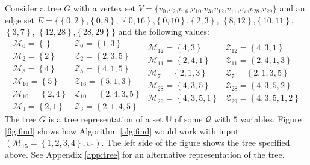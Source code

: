 Consider a tree $G$ with a vertex set
$
V =
\{
v_0$,$v_2$,$v_{16}$,$v_{10}$,$v_3$,$v_{12}$,$v_{11}$,$v_7$,$v_{28}$,$v_{29}
\}
$
and an edge set
$
E = \{
\left\{{0,2}\right\}$,$\left\{{0,8}\right\}$,
$\left\{{0,16}\right\}$,$\left\{{0,10}\right\}$,$\left\{{2,3}\right\}$,
$\left\{{8,12}\right\}$,$\left\{{10,11}\right\}$,
$\left\{{3,7}\right\}$,
$\left\{{12,28}\right\}$,$\left\{{28,29}\right\} \}
$
and the following values:
\[
    \begin{array}{ll}
        \mathcal{M}_0    = \left\{{}\right\}           & \mathcal{Z}_0    = \left\{{1,3}\right\} \\
        \mathcal{M}_2    = \left\{{2}\right\}          & \mathcal{Z}_2    = \left\{{2,3,5}\right\} \\
        \mathcal{M}_8    = \left\{{4}\right\}          & \mathcal{Z}_8    = \left\{{4,1,5}\right\} \\
        \mathcal{M}_{16} = \left\{{5}\right\}          & \mathcal{Z}_{16} = \left\{{5,1,3}\right\} \\
        \mathcal{M}_{10} = \left\{{2,4}\right\}        & \mathcal{Z}_{10} = \left\{{2,4,3,5}\right\} \\
        \mathcal{M}_3    = \left\{{2,1}\right\}        & \mathcal{Z}_3    = \left\{{2,1,4,5}\right\}
    \end{array}
    \begin{array}{ll}
        \mathcal{M}_{12} = \left\{{4,3}\right\}        & \mathcal{Z}_{12} = \left\{{4,3,1}\right\} \\
        \mathcal{M}_{11} = \left\{{2,4,1}\right\}      & \mathcal{Z}_{11} = \left\{{2,4,1,3}\right\} \\
        \mathcal{M}_7    = \left\{{2,1,3}\right\}      & \mathcal{Z}_7    = \left\{{2,1,3,5}\right\} \\
        \mathcal{M}_{28} = \left\{{4,3,5}\right\}      & \mathcal{Z}_{28} = \left\{{4,3,5,2}\right\} \\
        \mathcal{M}_{29} = \left\{{4,3,5,1}\right\}    & \mathcal{Z}_{29} = \left\{{4,3,5,1,2}\right\} \\
    \end{array}
\]
The tree $G$ is a tree representation of a set $\mathbb{U}$ of some
$\mathcal{Q}$ with $5$ variables.
Figure \ref{fig:find} shows how Algorithm \ref{alg:find} would work with input
$(\mathcal{M}_{15} = \left\{{1,2,3,4}\right\}, v_0)$.
The left side of the figure shows the tree specified above.
See Appendix \ref{app:tree} for an alternative representation of the tree.

